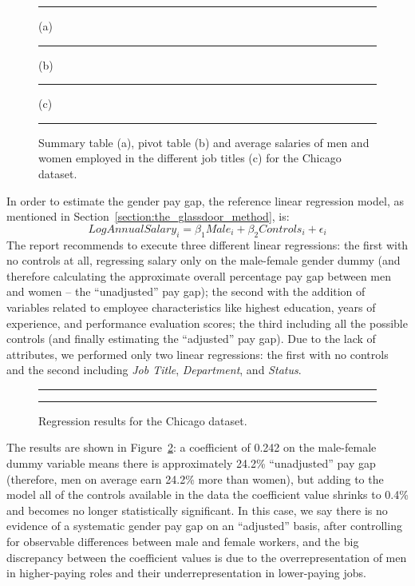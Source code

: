 \begin{figure}[t!]
\centering
\noindent\rule{\linewidth}{0.4pt}\par
\caption*{(a)}
\noindent\rule{\linewidth}{0.4pt}\par
\caption*{(b)}
\noindent\rule{\linewidth}{0.4pt}\par
\caption*{(c)}
\noindent\rule{\linewidth}{0.4pt}
\caption{Summary table (a), pivot table (b) and average salaries of men and women employed in the different job titles (c) for the Chicago dataset.}
\label{fig:chicago_glassdoor1}
\end{figure}

In order to estimate the gender pay gap, the reference linear regression model, as mentioned in Section~\ref{section:the_glassdoor_method}, is: \[\mathit{Log Annual Salary}_i = \beta_1\textit{Male}_i + \beta_2\mathit{Controls}_i + \epsilon_i\]
The report recommends to execute three different linear regressions: the first with no controls at all, regressing salary only on the male-female gender dummy (and therefore calculating the approximate overall percentage pay gap between men and women -- the ``unadjusted'' pay gap); the second with the addition of variables related to employee characteristics like highest education, years of experience, and performance evaluation scores; the third including all the possible controls (and finally estimating the ``adjusted'' pay gap). Due to the lack of attributes, we performed only two linear regressions: the first with no controls and the second including \textit{Job Title}, \textit{Department}, and \textit{Status}.

\begin{figure}[t!]
\centering
\noindent\rule{\linewidth}{0.4pt}\par
\noindent\rule{\linewidth}{0.4pt}
\caption{Regression results for the Chicago dataset.}
\label{fig:chicago_glassdoor2}
\end{figure}

The results are shown in Figure~\ref{fig:chicago_glassdoor2}: a coefficient of 0.242 on the male-female dummy variable means there is approximately 24.2\% ``unadjusted'' pay gap (therefore, men on average earn 24.2\% more than women), but adding to the model all of the controls available in the data the coefficient value shrinks to 0.4\% and becomes no longer statistically significant. In this case, we say there is no evidence of a systematic gender pay gap on an ``adjusted'' basis, after controlling for observable differences between male and female workers, and the big discrepancy between the coefficient values is due to the overrepresentation of men in higher-paying roles and their underrepresentation in lower-paying jobs.


